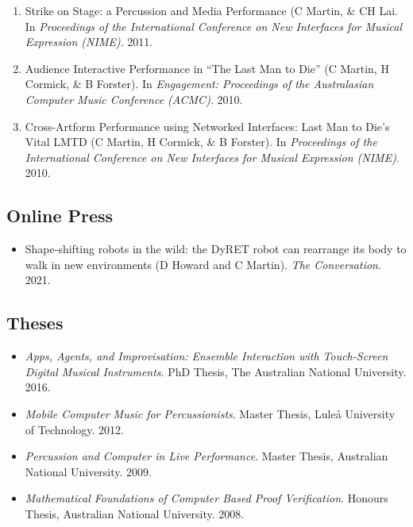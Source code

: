 \documentclass[11pt, a4paper, oneside]{article}
\begin{document}
\begin{enumerate}
\item Strike on Stage: a Percussion and Media Performance (C
  Martin, \& CH Lai. In \emph{Proceedings of the International
  Conference on New Interfaces for Musical Expression (NIME)}. 2011. 

\item Audience Interactive Performance in ``The Last Man to
    Die'' (C Martin, H Cormick, \& B Forster). In
  \emph{Engagement: Proceedings of the Australasian Computer Music
    Conference (ACMC)}. 2010. 

\item Cross-Artform Performance using Networked Interfaces: Last
    Man to Die's Vital LMTD (C Martin, H Cormick, \& B Forster).
  In \emph{Proceedings of the International Conference on New
  Interfaces for Musical Expression (NIME)}. 2010. 

\end{enumerate}

\subsection{Online Press}

\begin{itemize}

\item Shape-shifting robots in the wild: the DyRET robot can rearrange
  its body to walk in new environments (D Howard and C Martin).
  \emph{The Conversation}. 2021.

\end{itemize}

\subsection{Theses}
\begin{itemize}

\item \emph{Apps, Agents, and Improvisation: Ensemble Interaction with
    Touch-Screen Digital Musical Instruments}. PhD Thesis, The
  Australian National University. 2016. 

\item \emph{Mobile Computer Music for Percussionists}. Master
  Thesis, Lule{\aa} University of Technology. 2012.

\item \emph{Percussion and Computer in Live Performance}. Master
  Thesis, Australian National University. 2009. 

\item \emph{Mathematical Foundations of Computer Based Proof
    Verification}. Honours Thesis, Australian National University.
  2008.
\end{itemize}
\end{document}
